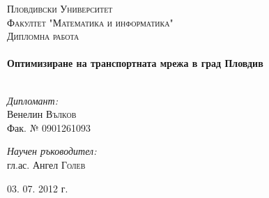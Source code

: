 
\begin{titlepage}

\begin{center}

\textsc{\LARGE Пловдивски Университет}\\[1.5cm]
\textsc{\LARGE Факултет "Математика и информатика"}\\[1.0cm]

\textsc{\Large Дипломна работа}\\[0.5cm]

\HRule \\[0.4cm]
{ \huge \bfseries Оптимизиране на транспортната мрежа в град Пловдив}\\[0.4cm]

\HRule \\[1.5cm]

\begin{minipage}{0.4\textwidth}
\begin{flushleft} \large
\emph{Дипломант:}\\
Венелин \textsc{Вълков}\\
Фак. № 0901261093
\end{flushleft}
\end{minipage}
\begin{minipage}{0.4\textwidth}
\begin{flushright} \large
\emph{Научен ръководител:} \\
гл.ас. Ангел \textsc{Голев}
\end{flushright}
\end{minipage}

\vfill

{\large 03. 07. 2012 г.}

\end{center}

\end{titlepage}